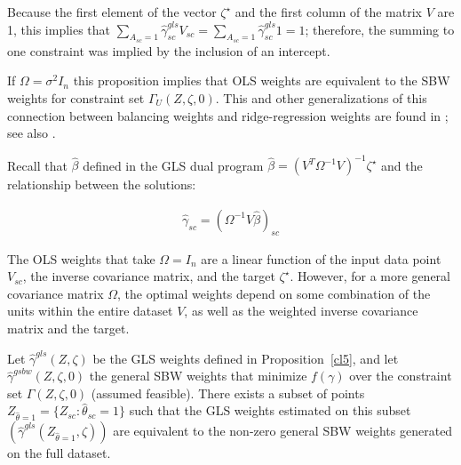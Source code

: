 \begin{remark}
    Because the first element of the vector $\zeta^\star$ and the first column of the matrix $V$ are 1, this implies that $\sum_{A_{sc} = 1}\hat{\gamma}_{sc}^{gls}V_{sc} = \sum_{A_{sc} = 1}\hat{\gamma}^{gls}_{sc}1 = 1$; therefore, the summing to one constraint was implied by the inclusion of an intercept.
\end{remark}

\begin{remark}
    If $\Omega = \sigma^2I_n$ this proposition implies that OLS weights are equivalent to the SBW weights for constraint set $\Gamma_U(Z, \zeta, 0)$. This and other generalizations of this connection between balancing weights and ridge-regression weights are found in \cite{ben2021augmented}; see also \cite{chattopadhyay2021implied}.
\end{remark}

\begin{remark}\label{rmk:olsweightsfixed}
    Recall that $\hat{\beta}$ defined in the GLS dual program $\hat{\beta} = (V^T\Omega^{-1}V)^{-1}\zeta^\star$ and the relationship between the solutions: 
    
    \begin{align*}
        \hat{\gamma}_{sc} = (\Omega^{-1}V\hat{\beta})_{sc}
    \end{align*}

    The OLS weights that take $\Omega = I_n$ are a linear function of the input data point $V_{sc}$, the inverse covariance matrix, and the target $\zeta^\star$. However, for a more general covariance matrix $\Omega$, the optimal weights depend on some combination of the units within the entire dataset $V$, as well as the weighted inverse covariance matrix and the target. 
\end{remark}

\begin{proposition}\label{cl6}
    Let $\hat{\gamma}^{gls}(Z, \zeta)$ be the GLS weights defined in Proposition~\ref{cl5}, and let $\hat{\gamma}^{gsbw}(Z, \zeta, 0)$  the general SBW weights that minimize $f(\gamma)$ over the constraint set $\Gamma(Z, \zeta, 0)$ (assumed feasible). There exists a subset of points $Z_{\hat{\theta} = 1} = \{Z_{sc}: \hat{\theta}_{sc} = 1\}$ such that the GLS weights estimated on this subset $(\hat{\gamma}^{gls}(Z_{\hat{\theta} = 1}, \zeta))$ are equivalent to the non-zero general SBW weights generated on the full dataset.
\end{proposition}

